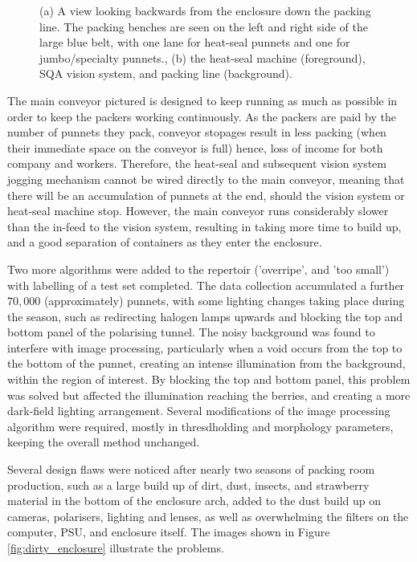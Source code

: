 \documentclass[fleqn,twoside]{article}
\begin{document}
\begin{figure}[ht]
\begin{subfigure}{.35\textwidth}
		\caption{}
		\label{fig:myponga_system_line}
	\end{subfigure}%
	
	\caption{(a) A view looking backwards from the enclosure down the packing line. The packing benches are seen on the left and right side of the large blue belt, with one lane for heat-seal punnets and one for jumbo/specialty punnets., (b) the heat-seal machine (foreground), SQA vision system, and packing line (background).}
	\label{}
\end{figure}

The main conveyor pictured is designed to keep running as much as possible in order to keep the packers working continuously. As the packers are paid by the number of punnets they pack, conveyor stopages result in less packing (when their immediate space on the conveyor is full) hence, loss of income for both company and workers. Therefore, the heat-seal and subsequent vision system jogging mechanism cannot be wired directly to the main conveyor, meaning that there will be an accumulation of punnets at the end, should the vision system or heat-seal machine stop. However, the main conveyor runs considerably slower than the in-feed to the vision system, resulting in taking more time to build up, and a good separation of containers as they enter the enclosure.

Two more algorithms were added to the repertoir ('overripe', and 'too small') with labelling of a test set completed. The data collection accumulated a further $70,000$ (approximately) punnets, with some lighting changes taking place during the season, such as redirecting halogen lamps upwards and blocking the top and bottom panel of the polarising tunnel. The noisy background was found to interfere with image processing, particularly when a void occurs from the top to the bottom of the punnet, creating an intense illumination from the background, within the region of interest. By blocking the top and bottom panel, this problem was solved but affected the illumination reaching the berries, and creating a more dark-field lighting arrangement. Several modifications of the image processing algorithm were required, mostly in thresdholding and morphology parameters, keeping the overall method unchanged. 

Several design flaws were noticed after nearly two seasons of packing room production, such as a large build up of dirt, dust, insects, and strawberry material in the bottom of the enclosure arch, added to the dust build up on cameras, polarisers, lighting and lenses, as well as overwhelming the filters on the computer, PSU, and enclosure itself. The images shown in Figure \ref{fig:dirty_enclosure} illustrate the problems.
\end{document}
